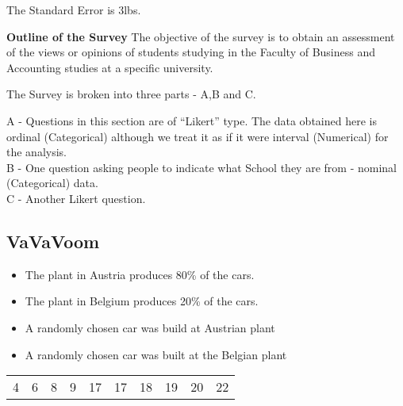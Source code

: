 \documentclass[]{report}
\begin{document}
\begin{enumerate}[(i)]
{	\vspace{0.1cm}
	
	The Standard Error is 3lbs.
	
	
	
}


\noindent  \textbf{Outline of the Survey}
	The objective of the survey is to obtain an assessment of the views or opinions of students studying in the Faculty of Business and Accounting studies at a specific university.
	
	\vspace{0.4cm}
	
	The Survey is broken into three parts - A,B and C. \\ \vspace{0.2cm}
	
	A - Questions in this section are of ``Likert'' type. The data obtained here is ordinal (Categorical) although we treat it as if it were interval (Numerical) for the analysis.\\
	\vspace{0.2cm}
	B - One question asking people to indicate what School they are from - nominal (Categorical) data.\\
	\vspace{0.2cm}
	C - Another Likert question.


\subsection{VaVaVoom}

\begin{itemize}
\item The plant in Austria produces 80\% of the cars.

\item The plant in Belgium produces 20\% of the cars.

\item A randomly chosen car was build at Austrian plant

\item A randomly chosen car was built at the Belgian plant

\end{itemize}



\begin{center}
\begin{tabular}{cccccccccc}
	\hline 
	4 & 6 & 8 & 9 & 17 & 17 & 18 & 19 & 20 & 22 \\ 
	

\end{tabular}
\end{center}
\end{enumerate}
\end{document}
